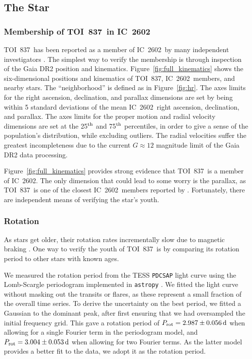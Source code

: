 \documentclass[12pt,twocolumn,tighten]{aastex63}
\newcommand{\tn}{TOI~837} %
\newcommand{\cn}{IC~2602} %
\begin{document}
\subsection{The Star}
\label{subsec:star}

\subsubsection{Membership of \tn\ in \cn}
\label{subsec:member}

\tn\ has been reported as a member of \cn\ by many independent
investigators \citep[{\it
e.g.},][]{Kharchenko_et_al_2013,oh_comoving_2017,cantatgaudin_gaia_2018,damiani_stellar_2019,kounkel_untangling_2019}.
The simplest way to verify the membership is through inspection of the
Gaia DR2 position and kinematics.  Figure~\ref{fig:full_kinematics}
shows the six-dimensional positions and kinematics of \tn, \cn\
members, and nearby stars.  The ``neighborhood'' is defined as in
Figure~\ref{fig:hr}.  The axes limits for the right ascension,
declination, and parallax dimensions are set by being within 5
standard deviations of the mean \cn\ right ascension, declination, and
parallax.  The axes limits for the proper motion and radial velocity
dimensions are set at the 25$^{\rm th}$ and 75$^{\rm th}$ percentiles,
in order to give a sense of the population's distribution, while
excluding outliers.  The radial velocities suffer the greatest
incompleteness due to the current $G\approx12$ magnitude limit of the
Gaia DR2 data processing.

Figure~\ref{fig:full_kinematics} provides strong evidence that \tn\ is
a member of \cn.  The only dimension that could lead to some worry is
the parallax, as \tn\ is one of the closest \cn\ members reported by
\citet{cantatgaudin_gaia_2018}.  Fortunately, there are independent
means of verifying the star's youth.

\subsubsection{Rotation}

As stars get older, their rotation rates incrementally slow due to
magnetic braking \cite{weber_angular_1967,skumanich_time_1972}.  One
way to verify the youth of \tn\ is by comparing its rotation period to
other stars with known ages.

We measured the rotation period from the TESS \texttt{PDCSAP} light
curve using the Lomb-Scargle periodogram implemented in
\texttt{astropy}
\citep{lomb_1976,scargle_studies_1982,vanderplas_periodograms_2015}.
We fitted the light curve without masking out the transits or flares,
as these represent a small fraction of the overall time series.  To
derive the uncertainty on the best period, we fitted a Gaussian to the
dominant peak, after first ensuring that we had oversampled the
initial frequency grid.  This gave a rotation period of $P_{\rm rot} =
2.987 \pm 0.056\,{\rm d}$ when allowing for a single Fourier term in
the periodogram model, and $P_{\rm rot} = 3.004 \pm 0.053\,{\rm d}$
when allowing for two Fourier terms.  As the latter model provides a
better fit to the data, we adopt it as the rotation period.
\end{document}
